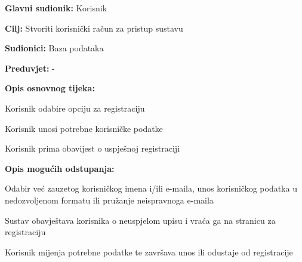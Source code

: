 					\noindent {}
					\begin{packed_item}
	
						\item \textbf{Glavni sudionik: } Korisnik
						\item  \textbf{Cilj:} Stvoriti korisnički račun za pristup sustavu
						\item  \textbf{Sudionici:} Baza podataka
						\item  \textbf{Preduvjet:} -
						\item  \textbf{Opis osnovnog tijeka:}
						
						\item[] \begin{packed_enum}
	
							\item Korisnik odabire opciju za registraciju
							\item Korisnik unosi potrebne korisničke podatke 
							\item Korisnik prima obavijest o uspješnoj registraciji
						\end{packed_enum}
						
						\item  \textbf{Opis mogućih odstupanja:}
						
						\item[] \begin{packed_item}
	
							\item[2.a] Odabir već zauzetog korisničkog imena i/ili e-maila, unos 
							korisničkog podatka u nedozvoljenom formatu ili pružanje neispravnoga e-maila
							\item[] \begin{packed_enum}
								
								\item Sustav obavještava korisnika o neuspjelom upisu i vraća ga na 
								stranicu za registraciju
								\item Korisnik mijenja potrebne podatke te završava unos ili odustaje od
								registracije
								
							\end{packed_enum}
						\end{packed_item}
					\end{packed_item}

